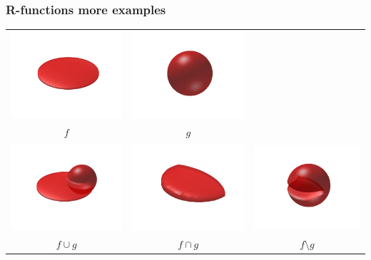 \documentclass{beamer}
\begin{document}
\begin{frame}
\frametitle{R-functions more examples} 
\begin{tabular}{ccc}
\includegraphics[width=.32\textwidth]{./figs/shape1.pdf} & 
\includegraphics[width=.32\textwidth]{./figs/shape2.pdf}  
\\
$f$ & $g$\\
\includegraphics[width=.32\textwidth]{./figs/union.pdf} & 
\includegraphics[width=.32\textwidth]{./figs/intersect.pdf} & 
\includegraphics[width=.32\textwidth]{./figs/diff.pdf}\\
$f \cup g$ & $f \cap g$ & $f \setminus g$ 
\end{tabular}
\end{frame} 
\end{document}
